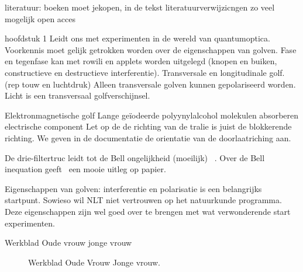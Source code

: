\documentclass[../../main.tex]{subfiles}
\begin{document}
literatuur: boeken moet jekopen, in de tekst literatuurverwijzicngen zo veel mogelijk  open acces


hoofdstuk 1
Leidt ons met experimenten in de wereld van quantumoptica. Voorkennis moet  gelijk getrokken worden over de eigenschappen van golven. Fase en tegenfase kan met rowili en applets worden uitgelegd (knopen en buiken, constructieve en destructieve interferentie). Transversale en longitudinale golf. (rep touw en luchtdruk)
Alleen transversale golven kunnen gepolariseerd worden.
Licht is een transversaal golfverschijnsel.

Elektronmagnetische golf
Lange ge\"iodeerde polyynylalcohol molekulen absorberen electrische component
Let op de de richting van de tralie is juist de blokkerende richting. We geven in de documentatie de orientatie van de doorlaatriching aan.

De drie-filtertruc leidt tot de Bell ongelijkheid (moeilijk)
~.
Over de Bell inequation geeft~ een mooie uitleg op papier.

Eigenschappen van golven: interferentie en polarisatie is een belangrijks startpunt. Sowieso wil NLT niet vertrouwen op het natuurkunde programma. Deze eigenschappen zijn wel goed over te brengen met wat verwonderende start experimenten. 

\clearpage
Werkblad Oude vrouw jonge vrouw 
\begin{center}
\leavevmode
\begin{figure}[h]
\def\ojfrangle{0}
\def\ojobangle{0}
\def\ojscale{1}
\caption{Werkblad Oude Vrouw Jonge vrouw.}
\label{fig:ovjvvectordoc}
\end{figure}
\end{center}
\end{document}

